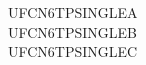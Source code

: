 \documentclass{abntexto-ufc}
\begin{document}
\imprimirfolhaderosto

\thispagestyle{empty}
\begingroup
\singlesp
\noindent UFCN6TPSINGLEA\\
UFCN6TPSINGLEB\\
UFCN6TPSINGLEC
\par
\endgroup
\end{document}
